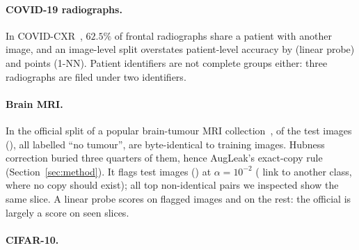 \paragraph{COVID-19 radiographs.}
In COVID-CXR~\citep{cohen2020covid}, $62.5\%$ of frontal radiographs share a patient with another image, and an image-level split overstates patient-level accuracy by \numCovidLpGap{} (linear probe) and \numCovidKnnGap{} points (1-NN). Patient identifiers are not complete groups either: three radiographs are filed under two identifiers.

\paragraph{Brain MRI.}
In the official split of a popular brain-tumour MRI collection~\citep{bhuvaji2020brain}, \numBTexact{} of the \numBTntest{} test images (\numBTexactPct{}), all labelled ``no tumour'', are byte-identical to training images. Hubness correction buried three quarters of them, hence AugLeak's exact-copy rule (Section~\ref{sec:method}). It flags \numBTflag{} test images (\numBTflagPct{}) at $\alpha=10^{-2}$ (\numBTcross{} link to another class, where no copy should exist); all \numBTyes{} top non-identical pairs we inspected show the same slice. A linear probe scores \numBTaccFlag{} on flagged images and \numBTaccClean{} on the rest: the official \numBTaccAll{} is largely a score on seen slices.

\paragraph{CIFAR-10.}
\numCifarText{}
